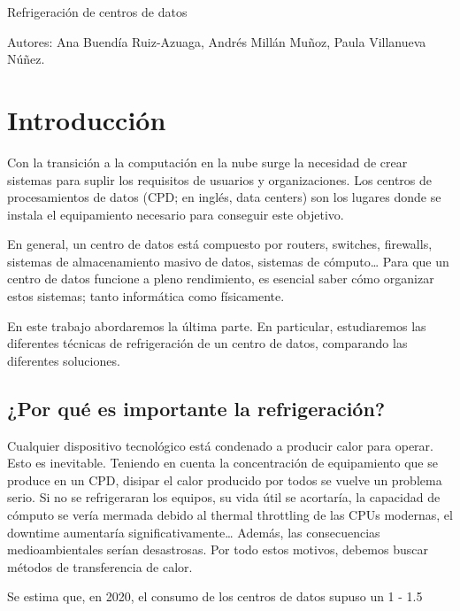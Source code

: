 Refrigeración de centros de datos

Autores: Ana Buendía Ruiz-Azuaga, Andrés Millán Muñoz, Paula Villanueva Núñez.


\section*{Introducción}

Con la transición a la computación en la nube surge la necesidad de crear sistemas para suplir los requisitos de usuarios y organizaciones. Los centros de procesamientos de datos (CPD; en inglés, data centers) son los lugares donde se instala el equipamiento necesario para conseguir este objetivo.

En general, un centro de datos está compuesto por routers, switches, firewalls, sistemas de almacenamiento masivo de datos, sistemas de cómputo… Para que un centro de datos funcione a pleno rendimiento, es esencial saber cómo organizar estos sistemas; tanto informática como físicamente.

En este trabajo abordaremos la última parte. En particular, estudiaremos las diferentes técnicas de refrigeración de un centro de datos, comparando las diferentes soluciones.

\subsection*{¿Por qué es importante la refrigeración?}


Cualquier dispositivo tecnológico está condenado a producir calor para operar. Esto es inevitable. Teniendo en cuenta la concentración de equipamiento que se produce en un CPD, disipar el calor producido por todos se vuelve un problema serio. Si no se refrigeraran los equipos, su vida útil se acortaría, la capacidad de cómputo se vería mermada debido al thermal throttling de las CPUs modernas, el downtime aumentaría significativamente… Además, las consecuencias medioambientales serían desastrosas. Por todo estos motivos, debemos buscar métodos de transferencia de calor.

Se estima que, en 2020, el consumo de los centros de datos supuso un 1 - 1.5%


